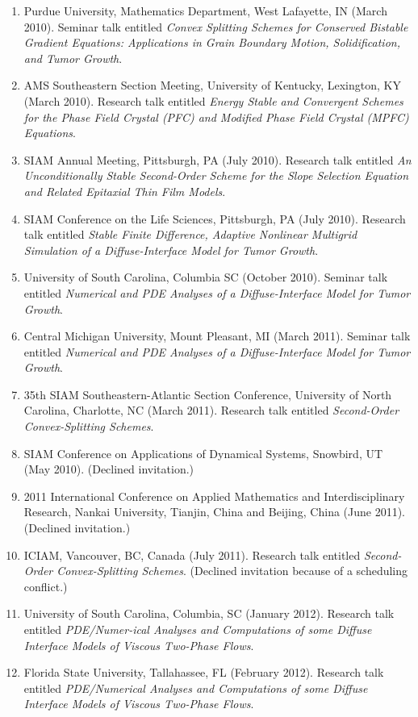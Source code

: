 \documentclass[11pt]{letter}
\begin{document}
\begin{enumerate}
    \item
Purdue University, Mathematics Department, West Lafayette, IN (March 2010).  Seminar talk entitled {\sl Convex Splitting Schemes for Conserved Bistable Gradient Equations: Applications in Grain Boundary Motion, Solidification, and Tumor Growth}.
	\item
AMS Southeastern Section Meeting, University of Kentucky, Lexington, KY (March 2010). Research talk entitled {\sl Energy Stable and Convergent Schemes for the Phase Field Crystal (PFC) and Modified Phase Field Crystal (MPFC) Equations}.
	\item
SIAM Annual Meeting, Pittsburgh, PA (July 2010). Research talk entitled {\sl An Unconditionally Stable Second-Order Scheme for the Slope Selection Equation and Related Epitaxial Thin Film Models}.
	\item
SIAM Conference on the Life Sciences, Pittsburgh, PA (July 2010). Research talk entitled {\sl Stable Finite Difference, Adaptive Nonlinear Multigrid Simulation of a Diffuse-Interface Model for Tumor Growth}.
	\item
University of South Carolina, Columbia SC (October 2010). Seminar talk entitled {\sl Numerical and PDE Analyses of a Diffuse-Interface Model for Tumor Growth}.
	\item
Central Michigan University, Mount Pleasant, MI (March 2011). Seminar talk entitled {\sl Numerical and PDE Analyses of a Diffuse-Interface Model for Tumor Growth}.
	\item
35th SIAM Southeastern-Atlantic Section Conference, University of North Carolina, Charlotte, NC (March 2011).  Research talk entitled {\sl Second-Order Convex-Splitting Schemes}.
	\item
SIAM Conference on Applications of Dynamical Systems, Snowbird, UT (May 2010). (Declined invitation.)
	\item
2011 International Conference on Applied Mathematics and Interdisciplinary Research, Nankai University, Tianjin, China and Beijing, China (June 2011). (Declined invitation.)
	\item
ICIAM, Vancouver, BC, Canada (July 2011). Research talk entitled {\sl Second-Order Convex-Splitting Schemes}. (Declined invitation because of a scheduling conflict.)
	\item
University of South Carolina, Columbia, SC (January 2012). Research talk entitled {\sl PDE/Numer-ical Analyses and Computations of some Diffuse Interface Models of Viscous Two-Phase Flows}.
	\item
Florida State University, Tallahassee, FL (February 2012). Research talk entitled {\sl PDE/Numerical Analyses and Computations of some Diffuse Interface Models of Viscous Two-Phase Flows}.

\end{enumerate}
\end{document}
